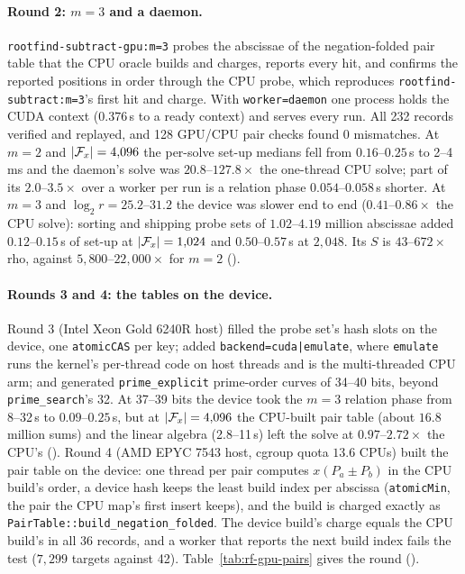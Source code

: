 \paragraph{Round 2: $m=3$ and a daemon.} \texttt{rootfind-subtract-gpu:m=3}
probes the abscissae of the negation-folded pair table that the CPU oracle
builds and charges, reports every hit, and confirms the reported
positions in order through the CPU probe, which reproduces
\texttt{rootfind-subtract:m=3}'s first hit and charge. With
\texttt{worker=daemon} one process holds the CUDA context ($0.376$\,s to a
ready context) and serves every run. All 232 records verified and
replayed, and 128 GPU/CPU pair checks found 0 mismatches. At $m=2$ and
$\lvert \mathcal{F}_x \rvert=4{,}096$ the per-solve set-up medians fell from
$0.16$--$0.25$\,s to 2--4\,ms and the daemon's solve was
$20.8$--$127.8\times$ the one-thread CPU solve; part of its $2.0$--$3.5\times$
over a worker per run is a relation phase $0.054$--$0.058$\,s shorter. At
$m=3$ and $\log_2r=25.2$--$31.2$ the device was slower end to end
($0.41$--$0.86\times$ the CPU solve): sorting and shipping probe sets of
$1.02$--$4.19$ million abscissae added $0.12$--$0.15$\,s of set-up at
$\lvert \mathcal{F}_x \rvert=1{,}024$ and $0.50$--$0.57$\,s at $2{,}048$. Its $S$ is
$43$--$672\times$ rho, against $5{,}800$--$22{,}000\times$ for $m=2$
().

\paragraph{Rounds 3 and 4: the tables on the device.} Round 3 (Intel Xeon
Gold 6240R host) filled the probe set's hash slots on the device, one
\texttt{atomicCAS} per key; added \texttt{backend=cuda|emulate}, where
\texttt{emulate} runs the kernel's per-thread code on host threads and is
the multi-threaded CPU arm; and generated \texttt{prime\_explicit}
prime-order curves of 34--40 bits, beyond \texttt{prime\_search}'s 32. At
37--39 bits the device took the $m=3$ relation phase from 8--32\,s to
$0.09$--$0.25$\,s, but at $\lvert \mathcal{F}_x \rvert=4{,}096$ the CPU-built pair table
(about $16.8$ million sums) and the linear algebra (2.8--11\,s) left the
solve at $0.97$--$2.72\times$ the CPU's
(). Round 4 (AMD
EPYC 7543 host, cgroup quota $13.6$ CPUs) built the pair table on the
device: one thread per pair computes $x(P_a\pm P_b)$ in the CPU build's
order, a device hash keeps the least build index per abscissa
(\texttt{atomicMin}, the pair the CPU map's first insert keeps), and the
build is charged exactly as \texttt{PairTable::build\_negation\_folded}.
The device build's charge equals the CPU build's in all 36 records, and a
worker that reports the next build index fails the test ($7{,}299$
targets against 42). Table~\ref{tab:rf-gpu-pairs} gives the round
().

